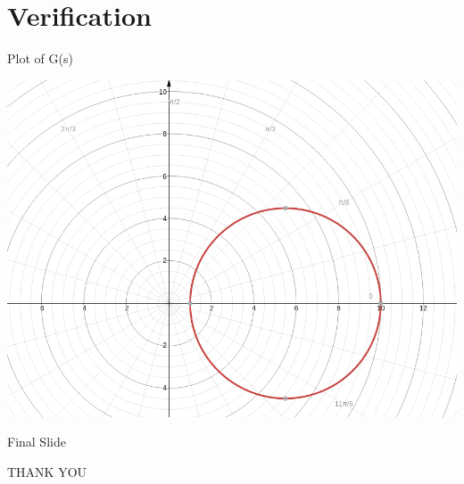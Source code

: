 \documentclass{beamer}
\begin{document}
\section{Verification}
\begin{frame}{Plot of G(s)}
\begin{center}
      \includegraphics[scale =0.3]{FFIG2.png}
\end{center}

\end{frame}

\begin{frame}{Final Slide}
\begin{center}
    THANK YOU
\end{center}
    
\end{frame}
    
\end{document}
